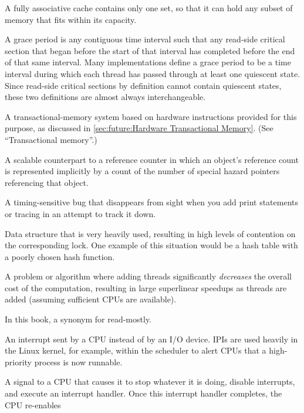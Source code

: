\begin{description}
	A fully associative cache contains only
	one set, so that it can hold any subset of
	memory that fits within its capacity.
\item[\IXG{Grace Period}:]
	A grace period is any contiguous time interval such that
	any  read-side critical section that began before the
	start of that interval has
	completed before the end of that same interval.
	Many  implementations define a grace period to be a
	time interval during which each thread has passed through at
	least one quiescent state.
	Since  read-side critical sections by definition cannot
	contain quiescent states, these two definitions are almost
	always interchangeable.
\item[Hardware Transactional Memory (HTM):]
	A transactional-memory system based on hardware instructions
	provided for this purpose, as discussed in
	\cref{sec:future:Hardware Transactional Memory}.
	(See ``Transactional memory''.)
\item[\IXG{Hazard Pointer}:]
	A scalable counterpart to a reference counter in which an
	object's reference count is represented implicitly by a count
	of the number of special hazard pointers referencing that object.
\item[\IXG{Heisenbug}:]
	A timing-sensitive bug that disappears from sight when you
	add print statements or tracing in an attempt to track it
	down.
\item[\IXG{Hot Spot}:]
	Data structure that is very heavily used, resulting in high
	levels of contention on the corresponding lock.
	One example of this situation would be a hash table with
	a poorly chosen hash function.
\item[\IXG{Humiliatingly Parallel}:]
	A problem or algorithm where adding threads significantly
	\emph{decreases} the overall cost of the computation, resulting in
	large superlinear speedups as threads are added (assuming sufficient
	CPUs are available).
\item[\IXG{Immutable}:]
	In this book, a synonym for read-mostly.
\item[Inter-Processor Interrupt (IPI):]
	An interrupt sent by a CPU instead of by an I/O device.
	IPIs are used heavily in the Linux kernel, for example, within
	the scheduler to alert CPUs that a high-priority process is now
	runnable.
\item[\IXG{Interrupt}:]
	A signal to a CPU that causes it to stop whatever it is doing,
	disable interrupts, and execute an interrupt handler.
	Once this interrupt handler completes, the CPU re-enables

\end{description}
